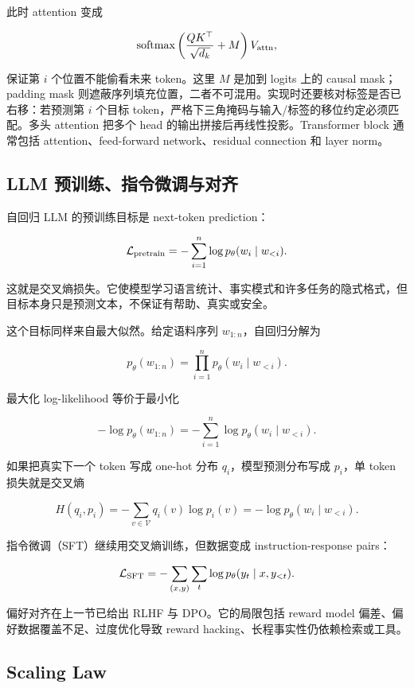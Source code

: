 \documentclass[11pt]{ctexart}
\begin{document}
此时 attention 变成

\[
  \operatorname{softmax}
  \left(
    \frac{QK^\top}{\sqrt{d_k}}+M
  \right)V_{\mathrm{attn}},
\]

保证第 \(i\) 个位置不能偷看未来 token。这里 \(M\) 是加到 logits 上的 causal mask；padding mask 则遮蔽序列填充位置，二者不可混用。实现时还要核对标签是否已右移：若预测第 \(i\) 个目标 token，严格下三角掩码与输入/标签的移位约定必须匹配。多头 attention 把多个 head 的输出拼接后再线性投影。Transformer block 通常包括 attention、feed-forward network、residual connection 和 layer norm。

\subsection{LLM 预训练、指令微调与对齐}


自回归 LLM 的预训练目标是 next-token prediction：

\[
  \mathcal{L}_{\mathrm{pretrain}}
  =
  -
  \sum_{i=1}^{n}
  \log p_\theta(w_i\mid w_{<i}).
\]

这就是交叉熵损失。它使模型学习语言统计、事实模式和许多任务的隐式格式，但目标本身只是预测文本，不保证有帮助、真实或安全。

这个目标同样来自最大似然。给定语料序列 \(w_{1:n}\)，自回归分解为

\[
  p_\theta(w_{1:n})
  =
  \prod_{i=1}^{n}p_\theta(w_i\mid w_{<i}).
\]

最大化 log-likelihood 等价于最小化

\[
  -\log p_\theta(w_{1:n})
  =
  -
  \sum_{i=1}^{n}
  \log p_\theta(w_i\mid w_{<i}).
\]

如果把真实下一个 token 写成 one-hot 分布 \(q_i\)，模型预测分布写成 \(p_i\)，单 token 损失就是交叉熵

\[
  H(q_i,p_i)
  =
  -
  \sum_{v\in\mathcal{V}}q_i(v)\log p_i(v)
  =
  -\log p_\theta(w_i\mid w_{<i}).
\]

指令微调（SFT）继续用交叉熵训练，但数据变成 instruction-response pairs：

\[
  \mathcal{L}_{\mathrm{SFT}}
  =
  -
  \sum_{(x,y)}
  \sum_{t}
  \log p_\theta(y_t\mid x,y_{<t}).
\]

偏好对齐在上一节已给出 RLHF 与 DPO。它的局限包括 reward model 偏差、偏好数据覆盖不足、过度优化导致 reward hacking、长程事实性仍依赖检索或工具。

\subsection{Scaling Law}
\end{document}

